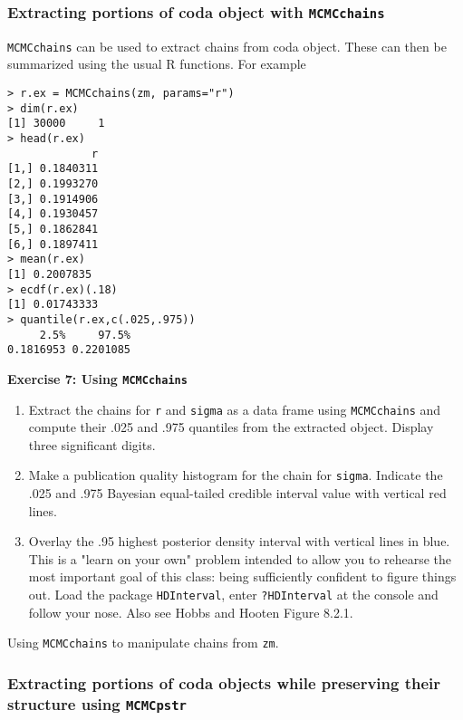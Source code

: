 \documentclass[12pt,english]{article}
\begin{document}
\subsubsection{Extracting portions of coda object with \texttt{MCMCchains}}

\texttt{MCMCchains} can be used to extract chains from coda object.  These can then be summarized using the usual R functions. For example

\begin{Verbatim}
> r.ex = MCMCchains(zm, params="r")
> dim(r.ex)
[1] 30000     1
> head(r.ex)
             r
[1,] 0.1840311
[2,] 0.1993270
[3,] 0.1914906
[4,] 0.1930457
[5,] 0.1862841
[6,] 0.1897411
> mean(r.ex)
[1] 0.2007835
> ecdf(r.ex)(.18)
[1] 0.01743333
> quantile(r.ex,c(.025,.975))
     2.5%     97.5% 
0.1816953 0.2201085
 \end{Verbatim}

\bigskip
\belowcaptionskip=-20pt
\begin{exercise}
\begin{mdframed}
\doublespacing
\textbf{Exercise 7: Using \texttt{MCMCchains}} 
\begin{enumerate}
\item Extract the chains for \texttt{r} and \texttt{sigma} as a data frame using \texttt{MCMCchains} and compute their .025 and .975 quantiles from the extracted object.  Display three significant digits.
\item Make a publication quality histogram for the chain for \texttt{sigma}. Indicate the .025 and .975 Bayesian equal-tailed credible interval value with  vertical red lines.
\item Overlay the .95 highest posterior density interval with vertical lines in blue. This is a "learn on your own" problem intended to allow you to rehearse the most important goal of this class: being sufficiently confident to figure things out.  Load the package \texttt{HDInterval}, enter \texttt{?HDInterval} at the console and follow your nose. Also see Hobbs and Hooten Figure 8.2.1.  
\end{enumerate}
\end{mdframed}
\captionsetup{textformat=empty, labelformat=empty}
\caption[Using \texttt{MCMCchains} to manipulate chains from \texttt{zm}]{Using \texttt{MCMCchains} to manipulate chains from \texttt{zm}.}
\label{ex:MCMCchains}
\end{exercise}
\belowcaptionskip=0pt

\subsubsection{Extracting portions of coda objects while preserving their structure using  \texttt{MCMCpstr}}
\end{document}
